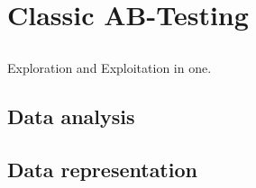 \documentclass[main.tex]{subfiles}
\begin{document}
\chapter{Classic AB-Testing}
\section{}
Exploration and Exploitation in one.
\section{Data analysis}
\section{Data representation}
\end{document}

